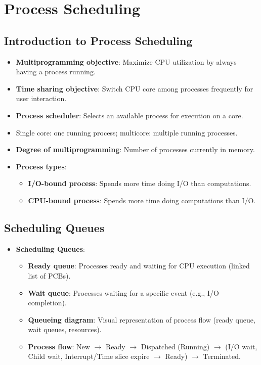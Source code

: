 \section{Process Scheduling}\label{sec:3.2}

\subsection{Introduction to Process Scheduling}
\begin{itemize}
    \item \textbf{Multiprogramming objective}: Maximize CPU utilization by always having a process running.
    \item \textbf{Time sharing objective}: Switch CPU core among processes frequently for user interaction.
    \item \textbf{Process scheduler}: Selects an available process for execution on a core.
    \item Single core: one running process; multicore: multiple running processes.
    \item \textbf{Degree of multiprogramming}: Number of processes currently in memory.
    \item \textbf{Process types}:
        \begin{itemize}
            \item \textbf{I/O-bound process}: Spends more time doing I/O than computations.
            \item \textbf{CPU-bound process}: Spends more time doing computations than I/O.
        \end{itemize}
\end{itemize}

\subsection{Scheduling Queues}
\begin{itemize}
    \item \textbf{Scheduling Queues}:
        \begin{itemize}
            \item \textbf{Ready queue}: Processes ready and waiting for CPU execution (linked list of PCBs).
            \item \textbf{Wait queue}: Processes waiting for a specific event (e.g., I/O completion).
            \item \textbf{Queueing diagram}: Visual representation of process flow (ready queue, wait queues, resources).
            \item \textbf{Process flow}: New $\rightarrow$ Ready $\rightarrow$ Dispatched (Running) $\rightarrow$ (I/O wait, Child wait, Interrupt/Time slice expire $\rightarrow$ Ready) $\rightarrow$ Terminated.
        \end{itemize}
\end{itemize}

